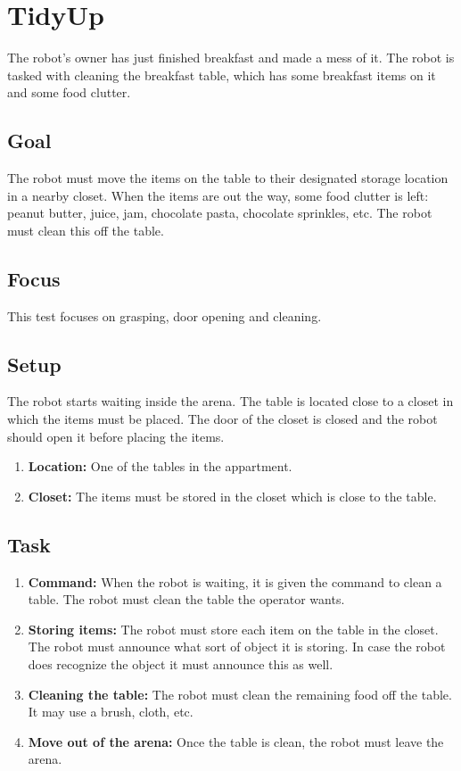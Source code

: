 \section{TidyUp}
The robot's owner has just finished breakfast and made a mess of it. 
The robot is tasked with cleaning the breakfast table, which has some breakfast items on it and some food clutter. 

\subsection{Goal}
The robot must move the items on the table to their designated storage location in a nearby closet. 
When the items are out the way, some food clutter is left: peanut butter, juice, jam, chocolate pasta, chocolate sprinkles, etc. 
The robot must clean this off the table. 

\subsection{Focus}
This test focuses on grasping, door opening and cleaning. 

\subsection{Setup}
The robot starts waiting inside the arena. 
The table is located close to a closet in which the items must be placed. 
The door of the closet is closed and the robot should open it before placing the items. 

\begin{enumerate}
\item \textbf{Location:} One of the tables in the appartment.
\item \textbf{Closet:} The items must be stored in the closet which is close to the table. 
\end{enumerate}

\subsection{Task}
\begin{enumerate}
\item \textbf{Command:} When the robot is waiting, it is given the command to clean a table. The robot must clean the table the operator wants.
\item \textbf{Storing items:} The robot must store each item on the table in the closet. 
  The robot must announce what sort of object it is storing. 
  In case the robot does recognize the object it must announce this as well. 
\item \textbf{Cleaning the table:} The robot must clean the remaining food off the table. It may use a brush, cloth, etc. 
\item \textbf{Move out of the arena:} Once the table is clean, the robot must leave the arena. 
\end{enumerate}

